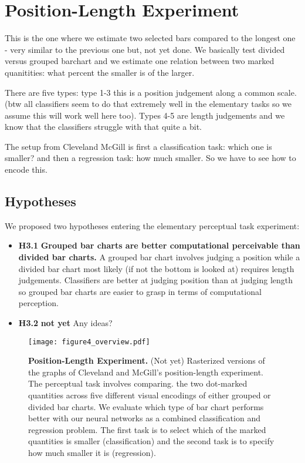 \section{Position-Length Experiment}

This is the one where we estimate two selected bars compared to the longest one - very similar to the previous one but, not yet done. We basically test divided versus grouped barchart and we estimate one relation between two marked quanitities: what percent the smaller is of the larger.

There are five types: type 1-3 this is a position judgement along a common scale. (btw all classifiers seem to do that extremely well in the elementary tasks so we assume this will work well here too). Types 4-5 are length judgements and we know that the classifiers struggle with that quite a bit.

The setup from Cleveland McGill is first a classification task: which one is smaller? and then a regression task: how much smaller. So we have to see how to encode this.


\subsection{Hypotheses}

We proposed two hypotheses entering the elementary perceptual task experiment:

\begin{itemize}
	\item \textbf{H3.1} \textbf{Grouped bar charts are better computational perceivable than divided bar charts.} A grouped bar chart involves judging a position while a divided bar chart most likely (if not the bottom is looked at) requires length judgements. Classifiers are better at judging position than at judging length so grouped bar charts are easier to grasp in terms of computational perception.
	\item \textbf{H3.2} \textbf{not yet} Any ideas?
\end{itemize}


\begin{figure*}[t]
	  \texttt{[image: figure4\_overview.pdf]}
	  
  \caption{\textbf{Position-Length Experiment.} (Not yet) Rasterized versions of the graphs of Cleveland and McGill's position-length experiment. The perceptual task involves comparing. the two dot-marked quantities across five different visual encodings of either grouped or divided bar charts. We evaluate which type of bar chart performs better with our neural networks as a combined classification and regression problem. The first task is to select which of the marked quantities is smaller (classification) and the second task is to specify how much smaller it is (regression).}
	\label{fig:position_length_experiment}
\end{figure*}

